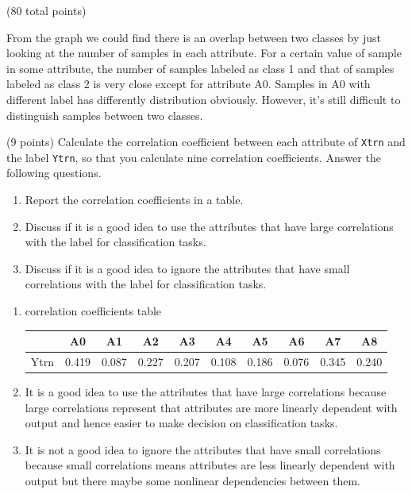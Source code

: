 \documentclass[12pt]{article}
\begin{document}
\begin{question}{(80 total points) \qOneTitle}
\begin{subquestion}
\begin{answerbox}{0.78\textheight}
  From the graph we could find there is an overlap between two classes by just looking at the number of samples in each attribute. For a certain value of sample in some attribute, the number of samples labeled as class 1 and that of samples labeled as class 2 is very close except for attribute A0. Samples in A0 with different label has differently distribution obviously. However, it's still difficult to distinguish samples between two classes.
  
  \end{answerbox}
  


\end{subquestion}

\begin{subquestion}{(9 points)
    Calculate the correlation coefficient between each attribute of {\tt Xtrn} and the label {\tt Ytrn}, so that you calculate nine correlation coefficients. Answer the following questions.
  }
  \begin{enumerate}\NARROWITEM
  \item Report the correlation coefficients in a table.
  \item Discuss if it is a good idea to use the attributes that have large
    correlations with the label for classification tasks.
  \item Discuss if it is a good idea to ignore the attributes that have small correlations with the label for classification tasks.
  \end{enumerate}


  \begin{answerbox}{25em}
    \begin{enumerate}
    \item correlation coefficients table
    \begin{center}
        \begin{tabular}{c|c|c|c|c|c|c|c|c|c} \hline
             &A0&A1&A2&A3&A4&A5&A6&A7&A8 \\ \hline
             Ytrn&0.419&0.087&0.227&0.207&0.108&0.186&0.076&0.345&0.240 \\ \hline
             
        \end{tabular}
    \end{center}
    \item It is a good idea to use the attributes that have large correlations because large correlations represent that attributes are more linearly dependent with output and hence easier to make decision on classification tasks.
    \item It is not a good idea to ignore the attributes that have small correlations because small correlations means attributes are less linearly dependent with output but there maybe some nonlinear dependencies between them.
    \end{enumerate}
  \end{answerbox}
  



\end{subquestion}
\end{question}
\end{document}
